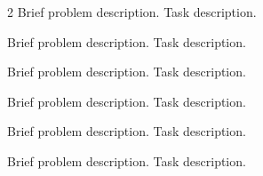 \begin{multicols}{2}
		Brief problem description. Task description.
		
		Brief problem description. Task description.
		
		Brief problem description. Task description.
		
		Brief problem description. Task description.
		
		Brief problem description. Task description.
		
		Brief problem description. Task description.
	\end{multicols}
	

